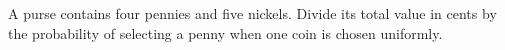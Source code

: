 A purse contains four pennies and five nickels. Divide its total value in cents by the probability of selecting a penny when one coin is chosen uniformly.
